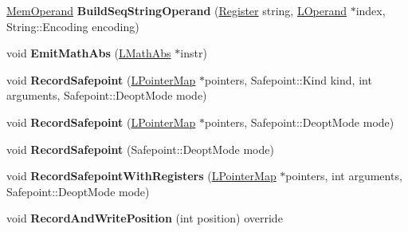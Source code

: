 \begin{DoxyCompactItemize}
\item 
\hyperlink{classv8_1_1internal_1_1_mem_operand}{Mem\+Operand} {\bfseries Build\+Seq\+String\+Operand} (\hyperlink{structv8_1_1internal_1_1_register}{Register} string, \hyperlink{classv8_1_1internal_1_1_l_operand}{L\+Operand} $\ast$index, String\+::\+Encoding encoding)\hypertarget{classv8_1_1internal_1_1_l_code_gen_a20aee7187252d655324a448e52b821d2}{}\label{classv8_1_1internal_1_1_l_code_gen_a20aee7187252d655324a448e52b821d2}

\item 
void {\bfseries Emit\+Math\+Abs} (\hyperlink{classv8_1_1internal_1_1_l_math_abs}{L\+Math\+Abs} $\ast$instr)\hypertarget{classv8_1_1internal_1_1_l_code_gen_a1181453c30d08db48c3bf19fc7515b2c}{}\label{classv8_1_1internal_1_1_l_code_gen_a1181453c30d08db48c3bf19fc7515b2c}

\item 
void {\bfseries Record\+Safepoint} (\hyperlink{classv8_1_1internal_1_1_l_pointer_map}{L\+Pointer\+Map} $\ast$pointers, Safepoint\+::\+Kind kind, int arguments, Safepoint\+::\+Deopt\+Mode mode)\hypertarget{classv8_1_1internal_1_1_l_code_gen_a5c5e6c0360111f74e6c274c456c70b74}{}\label{classv8_1_1internal_1_1_l_code_gen_a5c5e6c0360111f74e6c274c456c70b74}

\item 
void {\bfseries Record\+Safepoint} (\hyperlink{classv8_1_1internal_1_1_l_pointer_map}{L\+Pointer\+Map} $\ast$pointers, Safepoint\+::\+Deopt\+Mode mode)\hypertarget{classv8_1_1internal_1_1_l_code_gen_a7f742e0bc068c384673a3490e15b230c}{}\label{classv8_1_1internal_1_1_l_code_gen_a7f742e0bc068c384673a3490e15b230c}

\item 
void {\bfseries Record\+Safepoint} (Safepoint\+::\+Deopt\+Mode mode)\hypertarget{classv8_1_1internal_1_1_l_code_gen_a3621dccea782082b57057f617a9dd24a}{}\label{classv8_1_1internal_1_1_l_code_gen_a3621dccea782082b57057f617a9dd24a}

\item 
void {\bfseries Record\+Safepoint\+With\+Registers} (\hyperlink{classv8_1_1internal_1_1_l_pointer_map}{L\+Pointer\+Map} $\ast$pointers, int arguments, Safepoint\+::\+Deopt\+Mode mode)\hypertarget{classv8_1_1internal_1_1_l_code_gen_a15c074803ff1d0270234efb3e8830c75}{}\label{classv8_1_1internal_1_1_l_code_gen_a15c074803ff1d0270234efb3e8830c75}

\item 
void {\bfseries Record\+And\+Write\+Position} (int position) override\hypertarget{classv8_1_1internal_1_1_l_code_gen_a7f2c2fb5fe21ed4f96fa43839a3c459d}{}\label{classv8_1_1internal_1_1_l_code_gen_a7f2c2fb5fe21ed4f96fa43839a3c459d}


\end{DoxyCompactItemize}
